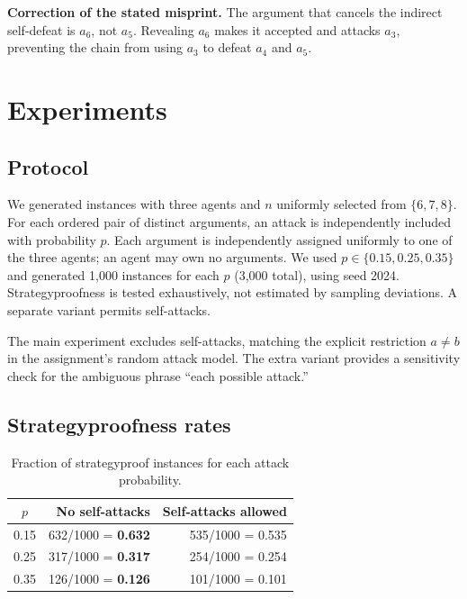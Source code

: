 \documentclass[11pt,a4paper]{article}
\newcommand{\result}[1]{\textbf{\color{navy}#1}}
\begin{document}
\textbf{Correction of the stated misprint.} The argument that cancels the indirect self-defeat is $a_6$, not $a_5$. Revealing $a_6$ makes it accepted and attacks $a_3$, preventing the chain from using $a_3$ to defeat $a_4$ and $a_5$.

\section{Experiments}

\subsection{Protocol}
We generated instances with three agents and $n$ uniformly selected from $\{6,7,8\}$. For each ordered pair of distinct arguments, an attack is independently included with probability $p$. Each argument is independently assigned uniformly to one of the three agents; an agent may own no arguments. We used $p\in\{0.15,0.25,0.35\}$ and generated 1,000 instances for each $p$ (3,000 total), using seed 2024. Strategyproofness is tested exhaustively, not estimated by sampling deviations. A separate variant permits self-attacks.

The main experiment excludes self-attacks, matching the explicit restriction $a\ne b$ in the assignment's random attack model. The extra variant provides a sensitivity check for the ambiguous phrase ``each possible attack.''

\subsection{Strategyproofness rates}
\begin{table}[ht]
\centering
\begin{tabular}{@{}crr@{}}
\toprule
$p$ & No self-attacks & Self-attacks allowed \\
\midrule
0.15 & 632/1000 = \result{0.632} & 535/1000 = 0.535 \\
0.25 & 317/1000 = \result{0.317} & 254/1000 = 0.254 \\
0.35 & 126/1000 = \result{0.126} & 101/1000 = 0.101 \\
\bottomrule
\end{tabular}
\caption{Fraction of strategyproof instances for each attack probability.}
\label{tab:sp}
\end{table}
\end{document}
